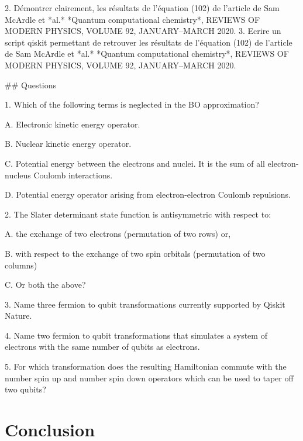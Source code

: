 \documentclass[12pt,a4paper]{article} %
\numberwithin{equation}{section} %
\numberwithin{figure}{section} %
\numberwithin{table}{section} %
\begin{document}
2. Démontrer clairement, les résultats de l'équation (102) de l'article de Sam McArdle et *al.* *Quantum computational chemistry*, REVIEWS OF MODERN PHYSICS, VOLUME 92, JANUARY–MARCH 2020.
3. Ecrire un script qiskit permettant de retrouver les résultats de l'équation (102) de l'article de Sam McArdle et *al.* *Quantum computational chemistry*, REVIEWS OF MODERN PHYSICS, VOLUME 92, JANUARY–MARCH 2020.

## Questions

1. Which of the following terms is neglected in the BO approximation?

    A.	Electronic kinetic energy operator.

    B.	Nuclear kinetic energy operator.

    C.	Potential energy between the electrons and nuclei. It is the sum of all electron-nucleus Coulomb interactions.

    D.	Potential energy operator arising from electron-electron Coulomb repulsions.
    
2. The Slater determinant state function is antisymmetric with respect to: 

    A.	the exchange of two electrons (permutation of two rows) or, 

    B.	with respect to the exchange of two spin orbitals (permutation of two columns)

    C.	Or both the above?

3. Name three fermion to qubit transformations currently supported by Qiskit Nature.

4. Name two fermion to qubit transformations that simulates a system of electrons with the same number of qubits as electrons.

5.	For which transformation does the resulting Hamiltonian commute with the number spin up and number spin down operators which can be used to taper off two qubits?

\section{Conclusion}
\end{document}
